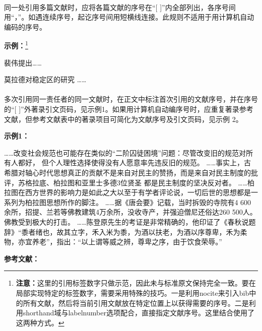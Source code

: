 \documentclass[twoside]{article}%
\begin{document}
\paragraph{}\label{sec:ref:ref} 同一处引用多篇文献时，应将各篇文献的序号在“[ ]”内全部列出，各序号间用“，”。如遇连续序号，起讫序号间用短横线连接。此规则不适用于用计算机自动编码的序号。

\begin{refsection}
\small
\textbf{示例：}\footnote{\textbf{注意：}这里的引用标签数字只做示范，因此未与标准原文保持完全一致。要在局部实现特定的标签数字，需要采用特殊的技巧。一是利用nocite来引入bib中的所有文献，然后将当前引用文献放在特定位置上以获得需要的序号。二是利用shorthand域与labelnumber选项配合，直接指定文献序号。这里结合使用了这两种方式。}

\nocite{*}
裴伟\cite{Humphrey1971--a,KENNEDY1975-311-386a}提出……

莫拉德对稳定区的研究
\cite{gbt7714.b.2:7,Weinstein1974-745-772,Roberson2011-1-36}……
\end{refsection}


\paragraph{}\label{sec:numeric:multic} 多次引用同一责任者的同一文献时，在正文中标注首次引用的文献序号，并在序号的“[ ]”外著录引文页码，见示例1。如果用计算机自动编序号时，应重复著录参考文献，但参考文献表中的著录项目可简化为文献序号及引文页码，见示例 2。

\begin{refsection}
\small
\textbf{示例1：}

……改变社会规范也可能存在类似的“二阶囚徒困境”问题：尽管改变旧的规范对所有人都好，
但个人理性选择使得没有人愿意率先违反旧的规范\cite{Sunstein1996-903-903}。
……事实上，古希腊对轴心时代思想真正的贡献不是来自对民主的赞扬，而是来自对民主制度的批评，苏格拉底、柏拉图和亚里士多德3位贤圣
都是民主制度的坚决反对者。
……柏拉图在西方世界的影响力是如此之大以至于有学者评论说，一切后世的思想都是一系列为柏拉图思想所作的脚注\cite{罗杰斯2011-15-16}。
……据《唐会要》记载，当时拆毁的寺院有4 600余所，招提、兰若等佛教建筑4万余所，没收寺产，并强迫僧尼还俗达260 500人。
佛教受到极大的打击。
……陈登原先生的考证是非常精确的，他印证了《春秋说题辞》“黍者绪也，故其立字，禾入米为黍，为酒以扶老，为酒以序尊卑，禾为柔物，亦宜养老”，指出：“以上谓等威之辨，尊卑之序，由于饮食荣辱。”\cite{陈登原2000-29-29}


\mbox{}{\small\textbf{参考文献：}\par}

\printbibliography[heading=none,env=indentegenvb]
\end{refsection}
\end{document}
